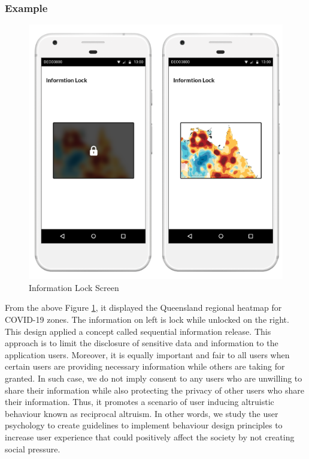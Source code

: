     \subsubsection{Example}
      \begin{figure}[H]
        \centering
        \includegraphics[scale=1]{img/digital-prototype/info-lock-screen.png}
        \caption{Information Lock Screen}
        \label{fig:digi-proto-03}
      \end{figure}
      \par From the above Figure \ref{fig:digi-proto-03}, it displayed the Queensland regional heatmap for COVID-19 zones. The information on left is lock while unlocked on the right. This design applied a concept called sequential information release. This approach is to limit the disclosure of sensitive data and information to the application users. Moreover, it is equally important and fair to all users when certain users are providing necessary information while others are taking for granted. In such case, we do not imply consent to any users who are unwilling to share their information while also protecting the privacy of other users who share their information. Thus, it promotes a scenario of user inducing altruistic behaviour known as reciprocal altruism. In other words, we study the user psychology to create guidelines to implement behaviour design principles to increase user experience that could positively affect the society by not creating social pressure.

